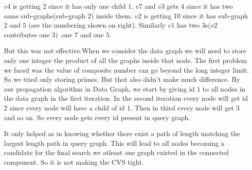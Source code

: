 \hspace{10mm}  $v4$ is getting 2 since it has only one child $1$. $v7$ and $v3$ gets 4 since it has two same sub-graphs(sub-graph $2$) inside them. $v2$ is getting 10 since it has sub-graph $2$ and $5$ (see the numbering shown on right). Similarly $v1$ has two $3$s($v2$ contributes one $3$) ,one $7$ and one $5$.

 \hspace{10mm}	But this was not effective.When we consider the data graph we will need to store only one integer the product of all the graphs inside that node. The first problem we faced was the value of composite number can go beyond the long integer limit. So we tried only storing primes. But that also didn't make much difference. By our propagation algorithm in Data Graph, we start by giving id $1$ to all nodes in the data graph in the first iteration. In the second iteration every node will get id $2$ since every node will have a child of id $1$. Then in third every node will get $3$ and so on. So every node gets every id present in query graph.
 
 \hspace{10mm} It only helped as in knowing whether there exist a path of length matching the largest length path in query graph. This will lead to all nodes becoming a candidate for the final search we atleast one graph existed in the connected component. So it is not making the CVS tight.
	